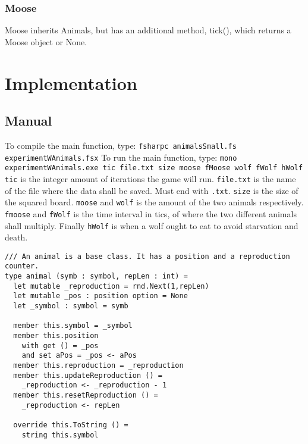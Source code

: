 \documentclass{article}
\begin{document}
    
    \subsubsection{Moose}
    	Moose inherits Animals, but has an additional method, tick(), which returns a Moose object or None.

    \section{Implementation}
        \subsection{Manual}
    To compile the main function, type: \newline \verb|fsharpc animalsSmall.fs experimentWAnimals.fsx|\newline
    To run the main function, type: \newline \verb|mono experimentWAnimals.exe tic file.txt size moose fMoose wolf fWolf hWolf|\newline
    \verb|tic| is the integer amount of iterations the game will run. \verb|file.txt| is the name of the file where the data shall be saved. Must end with \verb|.txt|. \verb|size| is the size of the squared board. \verb|moose|
    and \verb|wolf| is the amount of the two animals respectively. \verb|fmoose| and \verb|fWolf| is the time interval in tics, of where the two different animals shall multiply. Finally \verb|hWolf| is when a wolf ought to eat to avoid starvation and death.
		\lstset{language=FSharp}

		\begin{lstlisting}
/// An animal is a base class. It has a position and a reproduction counter.
type animal (symb : symbol, repLen : int) =
  let mutable _reproduction = rnd.Next(1,repLen)
  let mutable _pos : position option = None
  let _symbol : symbol = symb

  member this.symbol = _symbol
  member this.position
    with get () = _pos
    and set aPos = _pos <- aPos
  member this.reproduction = _reproduction
  member this.updateReproduction () =
    _reproduction <- _reproduction - 1
  member this.resetReproduction () =
    _reproduction <- repLen

  override this.ToString () =
    string this.symbol
		\end{lstlisting}
		
         
\end{document}
